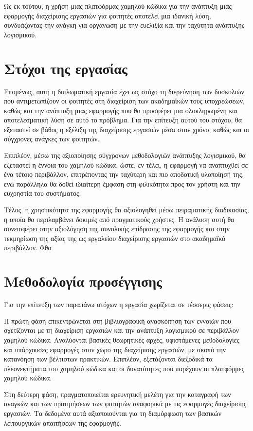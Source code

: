 		Ως εκ τούτου, η χρήση μιας πλατφόρμας χαμηλού κώδικα για την ανάπτυξη μιας εφαρμογής διαχείρισης εργασιών για φοιτητές αποτελεί μια ιδανική λύση, συνδυάζοντας την ανάγκη για οργάνωση με την ευελιξία και την ταχύτητα ανάπτυξης λογισμικού.


	\section{Στόχοι της εργασίας}
		Επομένως, αυτή η διπλωματική εργασία έχει ως στόχο τη διερεύνηση των δυσκολιών που αντιμετωπίζουν οι φοιτητές στη διαχείριση των ακαδημαϊκών τους υποχρεώσεων, καθώς και την ανάπτυξη μιας εφαρμογής που θα προσφέρει μια ολοκληρωμένη και αποτελεσματική λύση σε αυτό το πρόβλημα. Για την επίτευξη αυτού του στόχου, θα εξεταστεί σε βάθος η εξέλιξη της διαχείρισης εργασιών μέσα στον χρόνο, καθώς και οι σύγχρονες ανάγκες των φοιτητών.

		Επιπλέον, μέσω της αξιοποίησης σύγχρονων μεθοδολογιών ανάπτυξης λογισμικού, θα εξεταστεί η έννοια του χαμηλού κώδικα, ώστε, εν τέλει, η εφαρμογή να αναπτυχθεί σε ένα τέτοιο περιβάλλον, επιτρέποντας την ταχύτερη και πιο αποδοτική υλοποίησή της, ενώ παράλληλα θα δοθεί ιδιαίτερη έμφαση στη φιλικότητα προς τον χρήστη και την ευχρηστία του συστήματος.

		Τέλος, η χρηστικότητα της εφαρμογής θα αξιολογηθεί μέσω πειραματικής διαδικασίας, η οποία θα περιλαμβάνει δοκιμές από πραγματικούς χρήστες. Η ανάλυση αυτή θα συνεισφέρει στην αξιολόγηση της συνολικής επίδρασης της εφαρμογής και στην τεκμηρίωση της αξίας της ως εργαλείου διαχείρισης εργασιών στο ακαδημαϊκό περιβάλλον.
Φθα

	\section{Μεθοδολογία προσέγγισης}
		Για την επίτευξη των παραπάνω στόχων η εργασία χωρίζεται σε τέσσερις φάσεις:

		Η πρώτη φάση επικεντρώνεται στη βιβλιογραφική ανασκόπηση των εννοιών που σχετίζονται με τη διαχείριση εργασιών και την ανάπτυξη λογισμικού σε περιβάλλον χαμηλού κώδικα. Αναλύονται βασικές θεωρητικές αρχές, υφιστάμενες μεθοδολογίες και υπάρχουσες εφαρμογές στον χώρο της διαχείρισης εργασιών, με σκοπό την κατανόηση των βέλτιστων πρακτικών. Επιπλέον, εξετάζονται διεξοδικά τα πλεονεκτήματα του χαμηλού κώδικα και οι δυνατότητες που παρέχουν οι πλατφόρμες χαμηλού κώδικα.

		Στη δεύτερη φάση, πραγματοποιείται ερευνητική μελέτη για την καταγραφή των αναγκών και των προτιμήσεων των φοιτητών αναφορικά με τις εφαρμογές διαχείρισης εργασιών. Τα δεδομένα αυτά αξιοποιούνται για τη διαμόρφωση των βασικών λειτουργικών απαιτήσεων της εφαρμογής.

